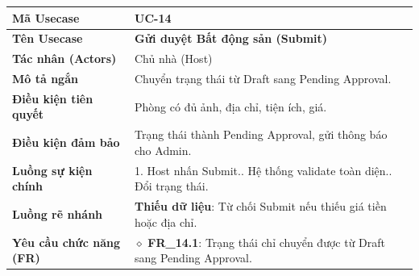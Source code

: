 \begin{table}[H]
\renewcommand{\arraystretch}{1.3}
\centering
\begin{tabularx}{\textwidth}{|p{4.5cm}|X|}
\hline
\cellcolor{gray!15}\bfseries Mã Usecase & \textbf{UC-14} \\ \hline
\cellcolor{gray!15}\bfseries Tên Usecase & \textbf{Gửi duyệt Bất động sản (Submit)} \\ \hline
\cellcolor{gray!15}\bfseries Tác nhân (Actors) & Chủ nhà (Host) \\ \hline
\cellcolor{gray!15}\bfseries Mô tả ngắn & Chuyển trạng thái từ Draft sang Pending Approval. \\ \hline
\cellcolor{gray!15}\bfseries Điều kiện tiên quyết & Phòng có đủ ảnh, địa chỉ, tiện ích, giá. \\ \hline
\cellcolor{gray!15}\bfseries Điều kiện đảm bảo & Trạng thái thành Pending Approval, gửi thông báo cho Admin. \\ \hline
\cellcolor{gray!15}\bfseries Luồng sự kiện chính & 1. Host nhấn Submit.\newline 2. Hệ thống validate toàn diện.\newline 3. Đổi trạng thái. \\ \hline
\cellcolor{gray!15}\bfseries Luồng rẽ nhánh & \textbf{Thiếu dữ liệu}: Từ chối Submit nếu thiếu giá tiền hoặc địa chỉ. \\ \hline
\cellcolor{gray!15}\bfseries Yêu cầu chức năng (FR) & $\diamond$ \textbf{FR\_14.1}: Trạng thái chỉ chuyển được từ Draft sang Pending Approval. \\ \hline
\end{tabularx}
\end{table}

